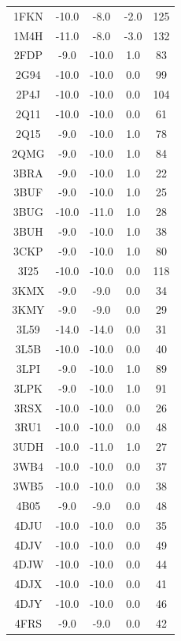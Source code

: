 \begin{center}
\begin{longtable}{ c c c c c }
      \hline
      1FKN & -10.0 &  -8.0 & -2.0 & 125 \\
      1M4H & -11.0 &  -8.0 & -3.0 & 132 \\
      2FDP &  -9.0 & -10.0 &  1.0 &  83 \\
      2G94 & -10.0 & -10.0 &  0.0 &  99 \\
      2P4J & -10.0 & -10.0 &  0.0 & 104 \\
      2Q11 & -10.0 & -10.0 &  0.0 &  61 \\
      2Q15 &  -9.0 & -10.0 &  1.0 &  78 \\
      2QMG &  -9.0 & -10.0 &  1.0 &  84 \\
      3BRA &  -9.0 & -10.0 &  1.0 &  22 \\
      3BUF &  -9.0 & -10.0 &  1.0 &  25 \\
      3BUG & -10.0 & -11.0 &  1.0 &  28 \\
      3BUH &  -9.0 & -10.0 &  1.0 &  38 \\
      3CKP &  -9.0 & -10.0 &  1.0 &  80 \\
      3I25 & -10.0 & -10.0 &  0.0 & 118 \\
      3KMX &  -9.0 &  -9.0 &  0.0 &  34 \\
      3KMY &  -9.0 &  -9.0 &  0.0 &  29 \\
      3L59 & -14.0 & -14.0 &  0.0 &  31 \\
      3L5B & -10.0 & -10.0 &  0.0 &  40 \\
      3LPI &  -9.0 & -10.0 &  1.0 &  89 \\
      3LPK &  -9.0 & -10.0 &  1.0 &  91 \\
      3RSX & -10.0 & -10.0 &  0.0 &  26 \\
      3RU1 & -10.0 & -10.0 &  0.0 &  48 \\
      3UDH & -10.0 & -11.0 &  1.0 &  27 \\
      3WB4 & -10.0 & -10.0 &  0.0 &  37 \\
      3WB5 & -10.0 & -10.0 &  0.0 &  38 \\
      4B05 &  -9.0 &  -9.0 &  0.0 &  48 \\
      4DJU & -10.0 & -10.0 &  0.0 &  35 \\
      4DJV & -10.0 & -10.0 &  0.0 &  49 \\
      4DJW & -10.0 & -10.0 &  0.0 &  44 \\
      4DJX & -10.0 & -10.0 &  0.0 &  41 \\
      4DJY & -10.0 & -10.0 &  0.0 &  46 \\
      4FRS &  -9.0 &  -9.0 &  0.0 &  42 \\

\end{longtable}
\end{center}

